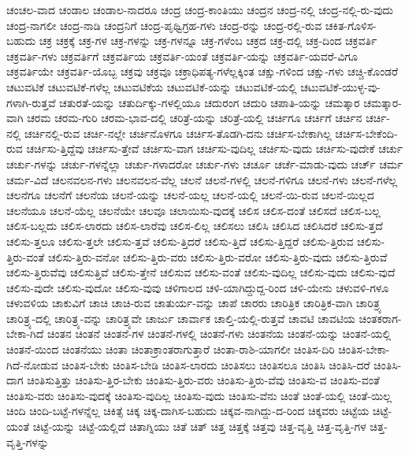 {ಚಂಚಲ-ವಾದ
ಚಂಡಾಲ
ಚಂಡಾಲ-ನಾದರೂ
ಚಂದ್ರ
ಚಂದ್ರ-ಕಾಂತಿಯು
ಚಂದ್ರನ
ಚಂದ್ರ-ನಲ್ಲಿ
ಚಂದ್ರ-ನಲ್ಲಿ-ರು-ವುದು
ಚಂದ್ರ-ನಾಗಲೀ
ಚಂದ್ರ-ನಾಡಿ
ಚಂದ್ರನಿಗೆ
ಚಂದ್ರ-ಪೃಥ್ವಿಗ್ರಹ-ಗಳು
ಚಂದ್ರ-ರನ್ನು
ಚಂದ್ರ-ರಲ್ಲಿ-ರುವ
ಚಕಿತ-ಗೊಳಿಸ-ಬಹುದು
ಚಕ್ರ
ಚಕ್ರಕ್ಕೆ
ಚಕ್ರ-ಗಳ
ಚಕ್ರ-ಗಳನ್ನು
ಚಕ್ರ-ಗಳನ್ನೂ
ಚಕ್ರ-ಗಳೆಂಬ
ಚಕ್ರದ
ಚಕ್ರ-ದಲ್ಲಿ
ಚಕ್ರ-ದಿಂದ
ಚಕ್ರವರ್ತಿ
ಚಕ್ರವರ್ತಿ-ಗಳು
ಚಕ್ರವರ್ತಿಗೆ
ಚಕ್ರವರ್ತಿಯ
ಚಕ್ರವರ್ತಿ-ಯಂತೆ
ಚಕ್ರವರ್ತಿ-ಯನ್ನು
ಚಕ್ರವರ್ತಿ-ಯವರೆ-ವಿಗೂ
ಚಕ್ರವರ್ತಿಯೇ
ಚಕ್ರವರ್ತಿ-ಯೊಬ್ಬ
ಚಕ್ರವು
ಚಕ್ರವೂ
ಚಕ್ರಾಧಿಪತ್ಯ-ಗಳೆಲ್ಲಕ್ಕಿಂತ
ಚಕ್ಷು-ಗಳಿಂದ
ಚಕ್ಷು-ಗಳು
ಚಚ್ಚಿ-ಕೊಂಡರೆ
ಚಟುವಟಿಕೆ
ಚಟುವಟಿಕೆ-ಗಳೆಲ್ಲ
ಚಟುವಟಿಕೆಯ
ಚಟುವಟಿಕೆ-ಯನ್ನು
ಚಟುವಟಿಕೆ-ಯಲ್ಲಿ
ಚಟುವಟಿಕೆ-ಯುಳ್ಳ-ವು-ಗಳಾಗಿ-ರುತ್ತವೆ
ಚತುರತೆ-ಯನ್ನು
ಚತುರ್ದಿಕ್ಕು-ಗಳಲ್ಲಿಯೂ
ಚದುರಂಗ
ಚದುರಿ
ಚಪಾತಿ-ಯನ್ನು
ಚಮತ್ಕಾರ
ಚಮತ್ಕಾರ-ವಾಗಿ
ಚರಮ
ಚರಮ-ಗುರಿ
ಚರಮ-ಭಾವ-ದಲ್ಲಿ
ಚರಿತ್ರೆ-ಯನ್ನು
ಚರಿತ್ರೆ-ಯಲ್ಲಿ
ಚರ್ಚಿಗೂ
ಚರ್ಚಿಗೆ
ಚರ್ಚಿನ
ಚರ್ಚಿ-ನಲ್ಲಿ
ಚರ್ಚಿನಲ್ಲಿ-ರುವ
ಚರ್ಚಿ-ನಲ್ಲೇ
ಚರ್ಚಿನೊಳಗೂ
ಚರ್ಚಿಸ-ತೊಡಗಿ-ದನು
ಚರ್ಚಿಸ-ಬೇಕಾಗಿಲ್ಲ
ಚರ್ಚಿಸ-ಬೇಕೆಂದಿ-ರುವ
ಚರ್ಚಿಸು-ತ್ತಿದ್ದೆವು
ಚರ್ಚಿಸು-ತ್ತೇವೆ
ಚರ್ಚಿಸು-ವಾಗ
ಚರ್ಚಿಸು-ವುದಿಲ್ಲ
ಚರ್ಚಿಸು-ವುದು
ಚರ್ಚಿಸು-ವುದೇಕೆ
ಚರ್ಚು
ಚರ್ಚು-ಗಳನ್ನು
ಚರ್ಚು-ಗಳನ್ನೆಲ್ಲಾ
ಚರ್ಚು-ಗಳಾದರೋ
ಚರ್ಚು-ಗಳು
ಚರ್ಚೂ
ಚರ್ಚೆ-ಮಾಡು-ವುದು
ಚರ್ಚ್
ಚರ್ಮ
ಚರ್ಮ-ವಿದೆ
ಚಲನವಲನ-ಗಳು
ಚಲನವಲನ-ವೆಲ್ಲ
ಚಲನೆ
ಚಲನೆ-ಗಳಲ್ಲಿ
ಚಲನೆ-ಗಳಿಗೂ
ಚಲನೆ-ಗಳು
ಚಲನೆ-ಗಳೆಲ್ಲ
ಚಲನೆಗೂ
ಚಲನೆಗೆ
ಚಲನೆಯ
ಚಲನೆ-ಯನ್ನು
ಚಲನೆ-ಯಲ್ಲ
ಚಲನೆ-ಯಲ್ಲಿ
ಚಲನೆ-ಯಿ-ರುವ
ಚಲನೆ-ಯಿಲ್ಲದ
ಚಲನೆಯೂ
ಚಲನೆ-ಯೆಲ್ಲ
ಚಲನೆಯೇ
ಚಲವೂ
ಚಲಾಯಿಸು-ವುದಕ್ಕೆ
ಚಲಿಸ
ಚಲಿಸ-ದಂತೆ
ಚಲಿಸದೆ
ಚಲಿಸ-ಬಲ್ಲ
ಚಲಿಸ-ಬಲ್ಲದು
ಚಲಿಸ-ಲಾರದು
ಚಲಿಸ-ಲಾರೆವು
ಚಲಿಸ-ಲಿಲ್ಲ
ಚಲಿಸಲು
ಚಲಿಸಿ
ಚಲಿಸಿದ
ಚಲಿಸಿದರೆ
ಚಲಿಸು-ತ್ತದೆ
ಚಲಿಸು-ತ್ತಲೂ
ಚಲಿಸು-ತ್ತಲೇ
ಚಲಿಸು-ತ್ತವೆ
ಚಲಿಸು-ತ್ತಿದರೆ
ಚಲಿಸು-ತ್ತಿದೆ
ಚಲಿಸು-ತ್ತಿದ್ದರೆ
ಚಲಿಸು-ತ್ತಿರುವ
ಚಲಿಸು-ತ್ತಿರು-ವಂತೆ
ಚಲಿಸು-ತ್ತಿರು-ವನೋ
ಚಲಿಸು-ತ್ತಿರು-ವರು
ಚಲಿಸು-ತ್ತಿರು-ವರೋ
ಚಲಿಸು-ತ್ತಿರು-ವುದು
ಚಲಿಸು-ತ್ತಿರುವೆ
ಚಲಿಸು-ತ್ತಿರುವೆವು
ಚಲಿಸುತ್ತಿವೆ
ಚಲಿಸು-ತ್ತೇನೆ
ಚಲಿಸುವ
ಚಲಿಸು-ವಂತೆ
ಚಲಿಸು-ವುದಿಲ್ಲ
ಚಲಿಸು-ವುದು
ಚಲಿಸು-ವುದೆ
ಚಲಿಸು-ವುದೇ
ಚಲಿಸು-ವುದೋ
ಚಲಿಸು-ವುವು
ಚಳಿಗಾಲದ
ಚಳಿ-ಯಾಗಿದ್ದುದ್ದ-ರಿಂದ
ಚಳಿ-ಯೇನು
ಚಳುವಳಿ-ಗಳೂ
ಚಳುವಳಿಯ
ಚಾಕುವಿಗೆ
ಚಾಚಿ
ಚಾಚಿ-ರುವ
ಚಾತುರ್ಯ-ವನ್ನು
ಚಾಪೆ
ಚಾರರು
ಚಾರಿತ್ರಿಕ
ಚಾರಿತ್ರಿಕ-ವಾಗಿ
ಚಾರಿತ್ರ್ಯ
ಚಾರಿತ್ರ್ಯ-ದಲ್ಲಿ
ಚಾರಿತ್ರ್ಯ-ವನ್ನು
ಚಾರಿತ್ರ್ಯವೇ
ಚಾರ್ಜು
ಚಾರ್ವಾಕ
ಚಾಲ್ತಿ-ಯಲ್ಲಿ-ರುತ್ತವೆ
ಚಾವಟಿ
ಚಾವಟಿಯ
ಚಿಂತಕರಾಗ-ಬೇಕಾ-ಗಿದೆ
ಚಿಂತನ
ಚಿಂತನೆ
ಚಿಂತನೆ-ಗಳ
ಚಿಂತನೆ-ಗಳಲ್ಲಿ
ಚಿಂತನೆ-ಗಳು
ಚಿಂತನೆಯ
ಚಿಂತನೆ-ಯನ್ನು
ಚಿಂತನೆ-ಯಲ್ಲಿ
ಚಿಂತನೆ-ಯಿಂದ
ಚಿಂತನೆಯು
ಚಿಂತಾ
ಚಿಂತಾಕ್ರಾಂತರಾಗುತ್ತಾರೆ
ಚಿಂತಾ-ರಾಶಿ-ಯಾಗಲೀ
ಚಿಂತಿಸ-ದಿರಿ
ಚಿಂತಿಸ-ಬೇಕಾ-ಗಿದೆ-ನೋಡುವ
ಚಿಂತಿಸ-ಬೇಕು
ಚಿಂತಿಸ-ಬೇಡಿ
ಚಿಂತಿಸ-ಲಾರದು
ಚಿಂತಿಸಲು
ಚಿಂತಿಸಲೂ
ಚಿಂತಿಸಿ
ಚಿಂತಿಸಿ-ದರೆ
ಚಿಂತಿಸಿ-ದಾಗ
ಚಿಂತಿಸುತ್ತಿತ್ತು
ಚಿಂತಿಸು-ತ್ತಿರ-ಬೇಕು
ಚಿಂತಿಸು-ತ್ತಿರು-ವರು
ಚಿಂತಿಸು-ತ್ತಿರು-ವೆವು
ಚಿಂತಿಸು-ವ
ಚಿಂತಿಸು-ವಂತೆ
ಚಿಂತಿಸು-ವರು
ಚಿಂತಿಸು-ವುದಕ್ಕೆ
ಚಿಂತಿಸು-ವುದಿಲ್ಲ
ಚಿಂತಿಸು-ವುದು
ಚಿಂತಿಸು-ವೆನು
ಚಿಂತೆ
ಚಿಂತೆ-ಯಲ್ಲಿ
ಚಿಂತೆ-ಯಿಲ್ಲ
ಚಿಂದಿ
ಚಿಂದಿ-ಬಟ್ಟೆ-ಗಳನ್ನೆಲ್ಲ
ಚಿಕಿತ್ಸೆ
ಚಿಕ್ಕ
ಚಿಕ್ಕ-ದಾಗಿಸ-ಬಹುದು
ಚಿಕ್ಕವ-ನಾಗಿದ್ದು-ದ-ರಿಂದ
ಚಿಕ್ಕವರು
ಚಿಟ್ಟೆಯ
ಚಿಟ್ಟೆ-ಯಂತೆ
ಚಿಟ್ಟೆ-ಯನ್ನು
ಚಿಟ್ಟೆ-ಯಲ್ಲಿದೆ
ಚಿತಾಗ್ನಿಯು
ಚಿತೆ
ಚಿತ್
ಚಿತ್ತ
ಚಿತ್ತಕ್ಕೆ
ಚಿತ್ತವು
ಚಿತ್ತ-ವೃತ್ತಿ
ಚಿತ್ತ-ವೃತ್ತಿ-ಗಳ
ಚಿತ್ತ-ವೃತ್ತಿ-ಗಳನ್ನು
}
